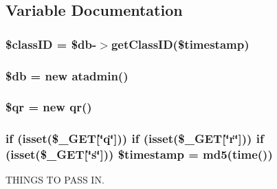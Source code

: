 \subsection{Variable Documentation}
\hypertarget{run_q_r_8php_a48ffa401b856e5d2f7f4617bb2a8d580}{
\subsubsection[{\$class\-I\-D}]{\setlength{\rightskip}{0pt plus 5cm}\$class\-I\-D = \${\bf db}-\/$>$get\-Class\-I\-D(\$timestamp)}}\label{run_q_r_8php_a48ffa401b856e5d2f7f4617bb2a8d580}
\hypertarget{run_q_r_8php_a1fa3127fc82f96b1436d871ef02be319}{
\subsubsection[{\$db}]{\setlength{\rightskip}{0pt plus 5cm}\${\bf db} = new {\bf atadmin}()}}\label{run_q_r_8php_a1fa3127fc82f96b1436d871ef02be319}
\hypertarget{run_q_r_8php_a2357c56e11778cb14e3c86756ae724be}{
\subsubsection[{\$qr}]{\setlength{\rightskip}{0pt plus 5cm}\${\bf qr} = new {\bf qr}()}}\label{run_q_r_8php_a2357c56e11778cb14e3c86756ae724be}
\hypertarget{run_q_r_8php_ada866527a98211212db3b2e4342397c9}{
\subsubsection[{\$timestamp}]{\setlength{\rightskip}{0pt plus 5cm}if (isset(\$\-\_\-\-G\-E\-T\mbox{[}\char`\"{}q\char`\"{}\mbox{]})) if (isset(\$\-\_\-\-G\-E\-T\mbox{[}\char`\"{}r\char`\"{}\mbox{]})) if (isset(\$\-\_\-\-G\-E\-T\mbox{[}\char`\"{}s\char`\"{}\mbox{]})) \$timestamp = md5(time())}}\label{run_q_r_8php_ada866527a98211212db3b2e4342397c9}


T\-H\-I\-N\-G\-S T\-O P\-A\-S\-S I\-N. 


